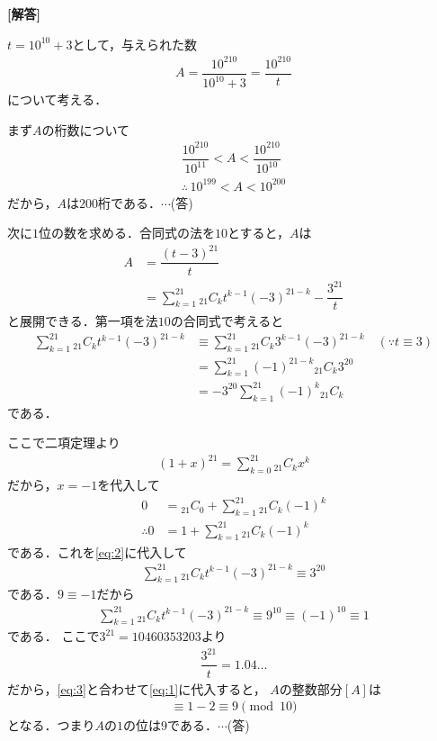 \documentclass[../../main.tex]{subfiles}
\begin{document}
\begin{oframed}
  
\end{oframed}

{\bf [解答]}

$t=10^{10}+3$として，与えられた数
\begin{align}
  A = \dfrac{10^{210}}{10^{10}+3} = \dfrac{10^{210}}{t}
\end{align}
について考える．

まず$A$の桁数について
\begin{align}
  \dfrac{10^{210}}{10^{11}}<A<\dfrac{10^{210}}{10^{10}} \\
  \therefore \,10^{199}<A<10^{200}
\end{align}
だから，$A$は$200$桁である．$\cdots$(答)

次に$1$位の数を求める．合同式の法を$10$とすると，$A$は
\begin{align}
  A
  &=\dfrac{(t-3)^{21}}{t} \\
  &=\sum_{k=1}^{21}{}_{21}C_kt^{k-1}(-3)^{21-k}-\dfrac{3^{21}}{t} \label{eq:1}
\end{align}
と展開できる．第一項を法$10$の合同式で考えると
\begin{align}
  \sum_{k=1}^{21}{}_{21}C_kt^{k-1}(-3)^{21-k}
  & \equiv \sum_{k=1}^{21}{}_{21}C_k3^{k-1}(-3)^{21-k} \quad (\because t\equiv 3)\\
  & = \sum_{k=1}^{21}(-1)^{21-k}{}_{21}C_k3^{20} \\
  & = -3^{20}\sum_{k=1}^{21}(-1)^{k}{}_{21}C_k \label{eq:2}
\end{align}
である．

ここで二項定理より
\begin{align}
  (1+x)^{21}=\sum_{k=0}^{21}{}_{21}C_kx^k
\end{align}
だから，$x=-1$を代入して
\begin{align}
  0 &={}_{21}C_0+\sum_{k=1}^{21}{}_{21}C_k(-1)^k \\
  \therefore
  0 &=1+\sum_{k=1}^{21}{}_{21}C_k(-1)^k
\end{align}
である．これを\cref{eq:2}に代入して
\begin{align}
  \sum_{k=1}^{21}{}_{21}C_kt^{k-1}(-3)^{21-k} \equiv 3^{20}
\end{align}
である．$9 \equiv -1$だから
\begin{align}
  \sum_{k=1}^{21}{}_{21}C_kt^{k-1}(-3)^{21-k}
  \equiv 9^{10}
  \equiv (-1)^{10}
  \equiv 1 \label{eq:3}
\end{align}
である．
ここで$3^{21}=10460353203$より
\begin{align}
  \dfrac{3^{21}}{t}=1.04\dots
\end{align}
だから，\cref{eq:3}と合わせて\cref{eq:1}に代入すると，
$A$の整数部分$[A]$は
\begin{align}
  [A] \equiv 1 - 2 \equiv 9 \pmod{10}
\end{align}
となる．つまり$A$の$1$の位は$9$である．$\cdots$(答)
\end{document}
